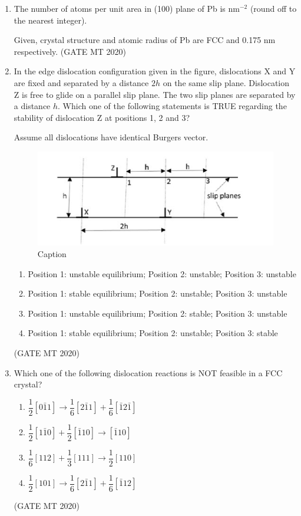 \documentclass[journal, 11pt, onecolumn]{IEEEtran}
\theoremstyle{remark}
\begin{document}
\begin{enumerate}
\item The number of atoms per unit area in (100) plane of Pb is \underline{\hspace{2cm}} nm$^{-2}$ (round off to the nearest integer).  

Given, crystal structure and atomic radius of Pb are FCC and 0.175 nm respectively.
\hfill(GATE MT 2020)


\item In the edge dislocation configuration given in the figure, dislocations X and Y are fixed and separated by a distance $2h$ on the same slip plane. Dislocation Z is free to glide on a parallel slip plane. The two slip planes are separated by a distance $h$. Which one of the following statements is TRUE regarding the stability of dislocation Z at positions 1, 2 and 3?  

Assume all dislocations have identical Burgers vector.  

\begin{figure}[H]
    \centering
    \includegraphics[width=0.5\linewidth]{figs/image7''.png}
    \caption{Caption}
    \label{fig:placeholder}
\end{figure}

\begin{enumerate} 
\item Position 1: unstable equilibrium; Position 2: unstable; Position 3: unstable  
\item Position 1: stable equilibrium; Position 2: unstable; Position 3: unstable  
\item Position 1: unstable equilibrium; Position 2: stable; Position 3: unstable  
\item Position 1: stable equilibrium; Position 2: unstable; Position 3: stable  
\end{enumerate}
\hfill(GATE MT 2020)


\item Which one of the following dislocation reactions is NOT feasible in a FCC crystal?  

\begin{enumerate}
\item $\dfrac{1}{2}[0\bar{1}1] \rightarrow \dfrac{1}{6}[2\bar{1}1] + \dfrac{1}{6}[\bar{1}2\bar{1}]$  
\item $\dfrac{1}{2}[1\bar{1}0] + \dfrac{1}{2}[\bar{1}10] \rightarrow [\bar{1}10]$  
\item $\dfrac{1}{6}[112] + \dfrac{1}{3}[111] \rightarrow \dfrac{1}{2}[110]$  
\item $\dfrac{1}{2}[101] \rightarrow \dfrac{1}{6}[2\bar{1}1] + \dfrac{1}{6}[\bar{1}12]$  
\end{enumerate}
\hfill(GATE MT 2020)



\end{enumerate}
\end{document}
